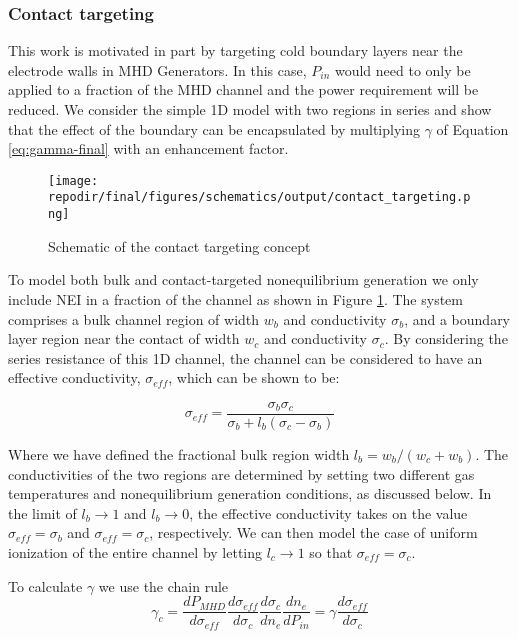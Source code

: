 \subsubsection{Contact targeting}


This work is motivated in part by targeting cold boundary layers near the electrode walls in MHD Generators. In this case, $P_{in}$ would need to only be applied to a fraction of the MHD channel and the power requirement will be reduced. We consider the simple 1D model with two regions in series and show that the effect of the boundary can be encapsulated by multiplying $\gamma$ of Equation \ref{eq:gamma-final} with an enhancement factor.



\begin{figure}[h]
    \texttt{[image: \\repodir/final/figures/schematics/output/contact\_targeting.png]} 
    \caption{Schematic of the contact targeting concept}
    \label{fig:SI_contact_targeting_schematic}
\end{figure}


To model both bulk and contact-targeted nonequilibrium generation we only include NEI in a fraction of the channel as shown in Figure \ref{fig:SI_contact_targeting_schematic}. The system comprises a bulk channel region of width $w_{b}$ and conductivity $\sigma_{b}$, and a boundary layer region near the contact of width $w_{c}$ and conductivity $\sigma_{c}$. By considering the series resistance of this 1D channel, the channel can be considered to have an effective conductivity, $\sigma_{eff}$, which can be shown to be:  

\[
\sigma_{eff}=\frac{\sigma_{b} \sigma_{c}}{\sigma_{b}+l_{b}  (\sigma_{c}  -\sigma_{b})}
\]

Where we have defined the fractional bulk region width $l_{b}=w_{b}/(w_{c}+w_{b})$. The conductivities of the two regions are determined by setting two different gas temperatures and nonequilibrium generation conditions, as discussed below. In the limit of $l_{b}\rightarrow1$ and $l_{b}\rightarrow0$, the effective conductivity takes on the value $\sigma_{eff}= \sigma_{b}$ and $\sigma_{eff}= \sigma_{c}$, respectively. We can then model the case of uniform ionization of the entire channel by letting $l_{c}\rightarrow1$ so that $\sigma_{eff}= \sigma_{c}$.

To calculate $\gamma$ we use the chain rule
\[
\gamma_{c}=\frac{dP_{MHD}}{d\sigma_{eff}} \frac{d\sigma_{eff}}{d\sigma_{c}} \frac{d\sigma_{c}}{dn_e} \frac{dn_e}{dP_{in}}=\gamma \frac{d\sigma_{eff}}{d\sigma_{c}} \tag{13}
\]

